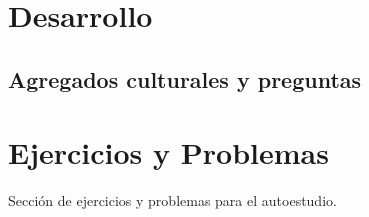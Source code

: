 \section{Desarrollo}

\subsection{Agregados culturales y preguntas}
{

}

\section{Ejercicios y Problemas}
{
    Sección de ejercicios y problemas para el autoestudio.
}